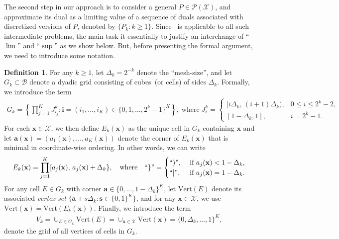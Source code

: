 \documentclass{article}
\theoremstyle{plain}
\theoremstyle{definition}
\newtheorem{definition}[definition]{Definition}
\newcommand{\calP}{\mathcal P}
\newcommand{\calX}{\mathcal X}
\newcommand{\calB}{\mathcal B}
\newcommand{\avec}{\mathbf{a}}
\newcommand{\ivec}{\mathbf{i}}
\newcommand{\svec}{\mathbf{s}}
\newcommand{\xvec}{\mathbf{x}}
\newcommand{\qtext}[1]{\quad \text{#1} \quad}
\newcommand{\Vertices}{\mathrm{Vert}}
\begin{document}
The second step in our approach is to consider a general $P \in \calP(\calX)$, and approximate its dual as a limiting value of a sequence of duals associated with discretized versions of $P$, denoted by $\{P_k: k \geq 1\}$. Since~ is applicable to all such intermediate problems, the main task it essentially to justify an interchange of ``$\lim$'' and ``$\sup$'' as we show below. But, before presenting the formal argument, we need to introduce some notation. 
\begin{definition}
    \label{def:grid-and-vertices}
    For any $k \geq 1$, let $\Delta_k = 2^{-k}$ denote the ``mesh-size'', and let $G_k \subset \calB$ denote a dyadic grid consisting of cubes~(or cells) of sides $\Delta_k$. Formally, we introduce the term 
    \begin{align}
        G_k = \left\{ \prod_{j=1}^K J_{i_j}^k: \ivec= (i_1, \ldots, i_K) \in \{0, 1, \ldots, 2^k-1\}^K\right\}, \; \text{where} \;  
        J_{i}^k = \begin{cases}
            [i \Delta_k, \,(i+1)\Delta_k), & 0 \leq i \leq 2^k - 2, \\
            [1-\Delta_k, 1], & i=2^k - 1. 
        \end{cases}
    \end{align}
    For each $\xvec \in \calX$, we then define $E_k(\xvec)$ as the unique cell in $G_k$ containing $\xvec$ and let $\avec(\xvec) = (a_1(\xvec), \ldots, a_K(\xvec))$ denote the corner of $E_k(\xvec)$ that is minimal in coordinate-wise ordering. In other words, we can write 
    \begin{align}
        E_k(\xvec) = \prod_{j=1}^K [a_j(\xvec), \, a_j(\xvec) + \Delta_k \}, \qtext{where} ``\}" =
        \begin{cases}
            ``)", & \text{ if } a_j(\xvec)  < 1 -  \Delta_k, \\
            ``]", &  \text{ if } a_j(\xvec) = 1 - \Delta_k. 
        \end{cases} 
    \end{align}
    For any cell $E \in G_k$ with corner $\avec \in \{0, \ldots, 1-\Delta_k\}^K$, let $\Vertices(E)$ denote its associated \emph{vertex set} $\{\avec + s \Delta_k: \svec \in \{0,1\}^K\}$, and for any $\xvec \in \calX$, we use $\Vertices(\xvec) = \Vertices(E_k(\xvec))$. Finally, we introduce the term 
    \begin{align}
        V_k = \cup_{E \in G_k} \Vertices(E) = \cup_{\xvec \in \calX} \Vertices(\xvec) =  \{0, \Delta_k, \ldots, 1\}^K, 
    \end{align}
    denote the grid of all vertices of cells in $G_k$.
\end{definition}
\end{document}
